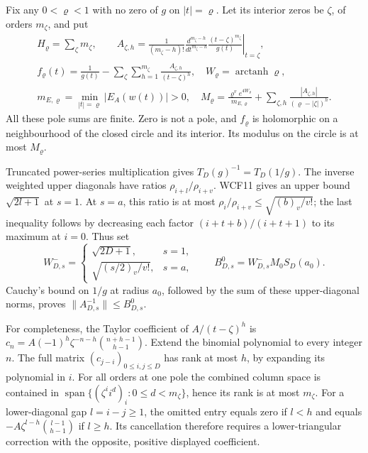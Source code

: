 Fix any $0<\varrho<1$ with no zero of $g$ on $|t|=\varrho$.
Let its interior zeros be $\zeta$, of orders $m_\zeta$, and put
\[
\begin{gathered}
 H_\varrho=\sum_\zeta m_\zeta,\qquad
 A_{\zeta,h}=\frac1{(m_\zeta-h)!}
   \left.\frac{d^{m_\zeta-h}}{dt^{m_\zeta-h}}
       \frac{(t-\zeta)^{m_\zeta}}{g(t)}\right|_{t=\zeta},\\
 f_\varrho(t)=\frac1{g(t)}-
       \sum_{\zeta}\sum_{h=1}^{m_\zeta}\frac{A_{\zeta,h}}{(t-\zeta)^h},
 \quad W_\varrho=\operatorname{arctanh}\varrho,\\
 m_{E,\varrho}=\min_{|t|=\varrho}|E_A(w(t))|>0,\quad
 M_\varrho=\frac{\varrho^ve^{4W_\varrho}}{m_{E,\varrho}}
       +\sum_{\zeta,h}\frac{|A_{\zeta,h}|}{(\varrho-|\zeta|)^h}.
\end{gathered}\tag{WCF15}
\]
All these pole sums are finite. Zero is not a pole, and $f_\varrho$
is holomorphic on a neighbourhood of the closed circle and its
interior. Its modulus on the circle is at most $M_\varrho$.

Truncated power-series multiplication gives
$T_D(g)^{-1}=T_D(1/g)$. The inverse weighted upper diagonals have
ratios $\rho_{i+l}/\rho_{i+v}$. WCF11 gives an upper bound
$\sqrt{2l+1}$ at $s=1$. At $s=a$, this ratio is at most
$\rho_i/\rho_{i+v}\le\sqrt{(b)_v/v!}$; the last inequality follows
by decreasing each factor $(i+t+b)/(i+t+1)$ to its maximum at $i=0$.
Thus set
\[
 W_{D,s}^-=
 \begin{cases}\sqrt{2D+1},&s=1,\\\sqrt{(s/2)_v/v!},&s=a,
 \end{cases}
 \qquad B^0_{D,s}=W_{D,s}^-M_0S_D(a_0).
 \tag{WCF16}
\]
Cauchy's bound on $1/g$ at radius $a_0$, followed by the sum of
these upper-diagonal norms, proves $\|A_{D,s}^{-1}\|\le B^0_{D,s}$.

For completeness, the Taylor coefficient of $A/(t-\zeta)^h$ is
$c_n=A(-1)^h\zeta^{-n-h}\binom{n+h-1}{h-1}$.
Extend the binomial polynomial to every integer $n$. The full matrix
$(c_{j-i})_{0\le i,j\le D}$ has rank at most $h$, by expanding its
polynomial in $i$. For all orders at one pole the combined column
space is contained in $\operatorname{span}\{(\zeta^ii^d)_i:
0\le d<m_\zeta\}$, hence its rank is at most $m_\zeta$.
For a lower-diagonal gap $l=i-j\ge1$, the omitted entry equals
zero if $l<h$ and equals
$-A\zeta^{l-h}\binom{l-1}{h-1}$ if $l\ge h$.
Its cancellation therefore requires a lower-triangular correction with
the opposite, positive displayed coefficient.

